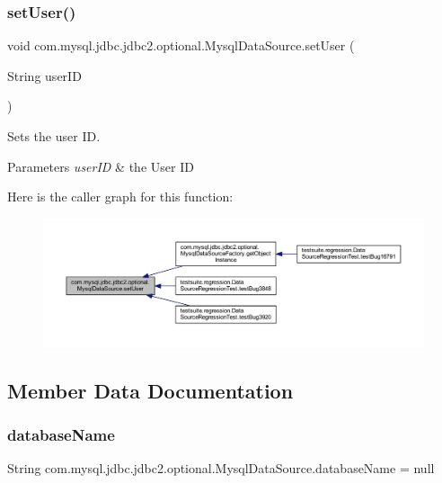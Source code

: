 \subsubsection{\texorpdfstring{set\+User()}{setUser()}}
{\footnotesize\ttfamily void com.\+mysql.\+jdbc.\+jdbc2.\+optional.\+Mysql\+Data\+Source.\+set\+User (\begin{DoxyParamCaption}\item[{String}]{user\+ID }\end{DoxyParamCaption})}

Sets the user ID.


\begin{DoxyParams}{Parameters}
{\em user\+ID} & the User ID \\
\hline
\end{DoxyParams}
Here is the caller graph for this function\+:
\nopagebreak
\begin{figure}[H]
\begin{center}
\leavevmode
\includegraphics[width=350pt]{classcom_1_1mysql_1_1jdbc_1_1jdbc2_1_1optional_1_1_mysql_data_source_ac80d398633ea31db75d7fbbba6f14c20_icgraph}
\end{center}
\end{figure}


\subsection{Member Data Documentation}
\mbox{\label{classcom_1_1mysql_1_1jdbc_1_1jdbc2_1_1optional_1_1_mysql_data_source_a9a4fed49fe5c75451a4e8a27556c703e}} 
\subsubsection{\texorpdfstring{database\+Name}{databaseName}}
{\footnotesize\ttfamily String com.\+mysql.\+jdbc.\+jdbc2.\+optional.\+Mysql\+Data\+Source.\+database\+Name = null\hspace{0.3cm}{\ttfamily [protected]}}


